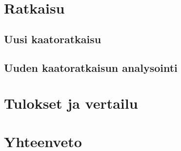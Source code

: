 \documentclass[finnish, numeric]{tauthesis}  %
\begin{document}
\chapter{Ratkaisu}
\label{ch:ratkaisu}

\section{Uusi kaatoratkaisu}
\label{ch:uusi_kaato}


\section{Uuden kaatoratkaisun analysointi}
\label{ch:uuden_analysointi}


\chapter{Tulokset ja vertailu}
\label{ch:vertailu}



\chapter{Yhteenveto}
\label{ch:yhteenveto}



\printbibliography[heading=bibintoc]



\end{document}

